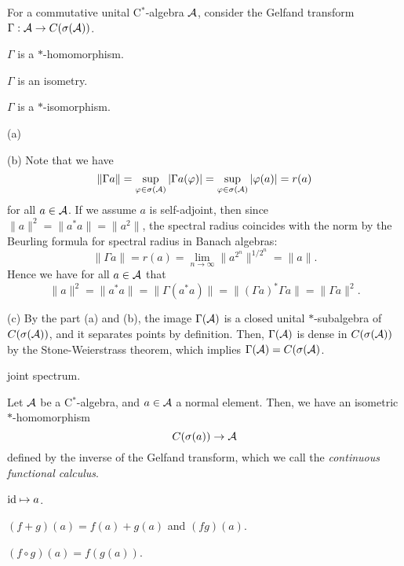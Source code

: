 \documentclass{../../large}
\begin{document}
\begin{prb}
For a commutative unital C$^*$-algebra $\mathcal{A}$, consider the Gelfand transform $\Gamma:\mathcal{A}\to C(\sigma(\mathcal{A}))$.
\begin{parts}
\item $\Gamma$ is a $*$-homomorphism.
\item $\Gamma$ is an isometry.
\item $\Gamma$ is a $*$-isomorphism.
\end{parts}
\end{prb}
\begin{pf}
(a)

(b)
Note that we have
\[\|\Gamma a\|=\sup_{\varphi\in\sigma(\mathcal{A})}|\Gamma a(\varphi)|=\sup_{\varphi\in\sigma(\mathcal{A})}|\varphi(a)|=r(a)\]
for all $a\in\mathcal{A}$.
If we assume $a$ is self-adjoint, then since $\|a\|^2=\|a^*a\|=\|a^2\|$, the spectral radius coincides with the norm by the Beurling formula for spectral radius in Banach algebras:
\[\|\Gamma a\|=r(a)=\lim_{n\to\infty}\|a^{2^n}\|^{1/2^n}=\|a\|.\]
Hence we have for all $a\in\mathcal{A}$ that
\[\|a\|^2=\|a^*a\|=\|\Gamma(a^*a)\|=\|(\Gamma a)^*\Gamma a\|=\|\Gamma a\|^2.\]

(c)
By the part (a) and (b), the image $\Gamma(\mathcal{A})$ is a closed unital $*$-subalgebra of $C(\sigma(\mathcal{A}))$, and it separates points by definition.
Then, $\Gamma(\mathcal{A})$ is dense in $C(\sigma(\mathcal{A}))$ by the Stone-Weierstrass theorem, which implies $\Gamma(\mathcal{A})=C(\sigma(\mathcal{A})$.
\end{pf}



\begin{prb}
joint spectrum.
\end{prb}


\begin{prb}
Let $\mathcal{A}$ be a C$^*$-algebra, and $a\in\mathcal{A}$ a normal element.
Then, we have an isometric $*$-homomorphism
\[C(\sigma(a))\to\mathcal{A}\]
defined by the inverse of the Gelfand transform, which we call the \emph{continuous functional calculus}.
\begin{parts}
\item $\operatorname{id}\mapsto a$.
\item $(f+g)(a)=f(a)+g(a)$ and $(fg)(a)$.
\item $(f\circ g)(a)=f(g(a))$.
\end{parts}
\end{prb}
\end{document}
